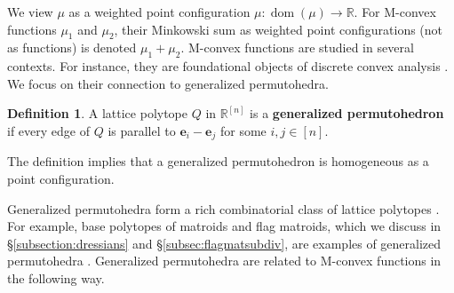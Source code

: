 \documentclass[11pt]{amsart}
\newcommand{\RR}{\mathbb R}
\newcommand{\ZZ}{\mathbb Z}
\newcommand{\TT}{\mathbb T}
\newcommand{\be}{\mathbf e}
\newcommand{\bv}{{\mathbf v}}
\newcommand{\bu}{{\mathbf u}}
\theoremstyle{definition}
\newtheorem{lem}[thm]{Lemma}
\newtheorem{defn}[thm]{Definition}
\newcommand{\chris}[1]{{\color{cyan} \sf Chris: [#1]}}
\begin{document}
We view $\mu$ as a weighted point configuration $\mu: \operatorname{dom}(\mu) \to \RR$.  For M-convex functions $\mu_1$ and $\mu_2$, their Minkowski sum as weighted point configurations (not as functions) is denoted $\mu_1 + \mu_2$. %
%
M-convex functions are studied in several contexts. For instance, they are foundational objects of discrete convex analysis \cite{Mur03}.  We focus on their connection to generalized permutohedra.

\begin{defn} A lattice polytope $Q$ in $\RR^{[n]}$ is a \textbf{generalized permutohedron} if every edge of $Q$ is parallel to $\be_i - \be_j$ for some $i,j \in [n]$.
\end{defn}

The definition implies that a generalized permutohedron is homogeneous as a point configuration.

\medskip
Generalized permutohedra form a rich combinatorial class of lattice polytopes \cite{Edm70, Pos09, AA17}.  For example, base polytopes of matroids and flag matroids, which we discuss in \S\ref{subsection:dressians} and \S\ref{subsec:flagmatsubdiv}, are examples of generalized permutohedra \cite{GGMS87, BGW03}.  
Generalized permutohedra are related to M-convex functions in the following way.
\end{document}
